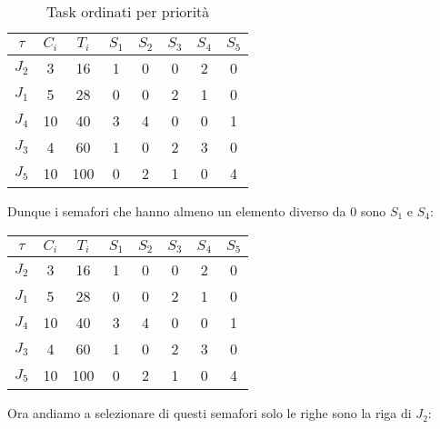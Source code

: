 \begin{Esercizio2}
\begin{table}[h]
\centering
\caption{Task ordinati per priorità}
\begin{tabular}{|c|c|c|c|c|c|c|c|}
\hline
\(\tau\) & $C_i$ & $T_i$ & $S_1$ & $S_2$ & $S_3$ & $S_4$ & $S_5$ \\
\hline
$J_2$ & 3 & 16 & 1 & 0 & 0 & 2 & 0 \\
\arrayrulecolor{red}\hline
\arrayrulecolor{black}
$J_1$ & 5 & 28 & 0 & 0 & 2 & 1 & 0 \\
\hline
$J_4$ & 10 & 40 & 3 & 4 & 0 & 0 & 1 \\
\hline
$J_3$ & 4 & 60 & 1 & 0 & 2 & 3 & 0 \\
\hline
$J_5$ & 10 & 100 & 0 & 2 & 1 & 0 & 4 \\
\hline
\end{tabular}
\label{tab:task_periodici_esercizio}
\end{table}

Dunque i semafori che hanno almeno un elemento diverso da 
0 sono \(S_{1}\) e \(S_{4}\):


\begin{table}[h]
\centering
\begin{tabular}{|c|c|c|c|c|c|c|c|}
\hline
\(\tau\) & $C_i$ & $T_i$ & \cellcolor{blue!20}$S_1$ & $S_2$ & $S_3$ & \cellcolor{blue!20}$S_4$ & $S_5$ \\
\hline
$J_2$ & 3 & 16 & \cellcolor{blue!20}1 & 0 & 0 & \cellcolor{blue!20}2 & 0 \\
\arrayrulecolor{red}\hline
\arrayrulecolor{black}
$J_1$ & 5 & 28 & \cellcolor{blue!20}0 & 0 & 2 & \cellcolor{blue!20}1 & 0 \\
\hline
$J_4$ & 10 & 40 & \cellcolor{blue!20}3 & 4 & 0 & \cellcolor{blue!20}0 & 1 \\
\hline
$J_3$ & 4 & 60 & \cellcolor{blue!20}1 & 0 & 2 & \cellcolor{blue!20}3 & 0 \\
\hline
$J_5$ & 10 & 100 & \cellcolor{blue!20}0 & 2 & 1 & \cellcolor{blue!20}0 & 4 \\
\hline
\end{tabular}
\label{tab:task_periodici_esercizio}
\end{table}

Ora andiamo a selezionare di questi semafori solo le 
righe sono la riga di \(J_{2}\):



\end{Esercizio2}
